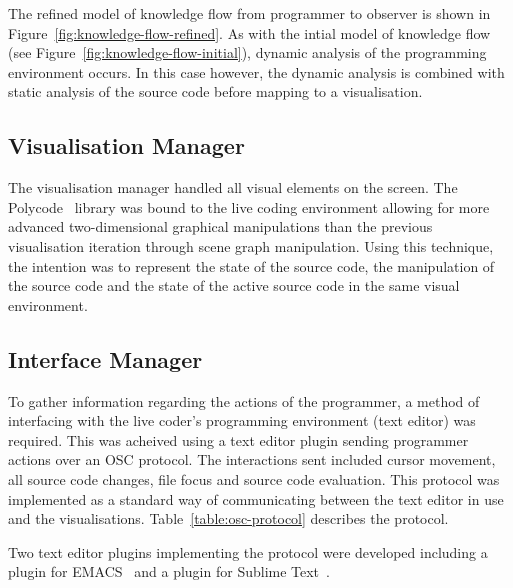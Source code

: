 The refined model of knowledge flow from programmer to observer is shown in Figure~\ref{fig:knowledge-flow-refined}. As with the intial model of knowledge flow (see Figure~\ref{fig:knowledge-flow-initial}), dynamic analysis of the programming environment occurs. In this case however, the dynamic analysis is combined with static analysis of the source code before mapping to a visualisation.


\subsection{Visualisation Manager}

The visualisation manager handled all visual elements on the screen. The Polycode~\cite{Safrin2013} library was bound to the live coding environment allowing for more advanced two-dimensional graphical manipulations than the previous visualisation iteration through scene graph manipulation. Using this technique, the intention was to represent the state of the source code, the manipulation of the source code and the state of the active source code in the same visual environment.

\subsection{Interface Manager}
\label{sec:interface-manager}

To gather information regarding the actions of the programmer, a method of interfacing with the live coder's programming environment (text editor) was required. This was acheived using a text editor plugin sending programmer actions over an \ac{OSC} protocol. The interactions sent included cursor movement, all source code changes, file focus and source code evaluation. This protocol was implemented as a standard way of communicating between the text editor in use and the visualisations. Table~\ref{table:osc-protocol} describes the protocol.

Two text editor plugins implementing the protocol were developed including a plugin for EMACS~\cite{Stallman1981} and a plugin for Sublime Text~\cite{Skinner2013}.

